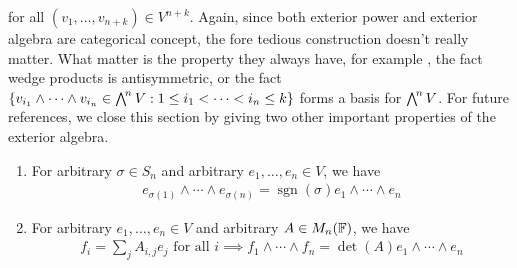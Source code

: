 \documentclass{report}
\begin{document}
for all $(v_1,\dots ,v_{n+k})\in V^{n+k}$. Again, since both exterior power and exterior algebra are categorical concept, the fore tedious construction doesn't really matter. What matter is the property they always have, for example , the fact wedge products is antisymmetric, or the fact $\set{v_{i_1}\wedge  \cdots \wedge  v_{i_n} \in \extp^n V: 1\leq i_1 < \cdots < i_n \leq k  }$ forms a basis for $\extp^n V$. For future references, we close this section by giving two other important properties of the exterior algebra. 
\begin{enumerate}[label=(\alph*)]
  \item For arbitrary $\sigma \in S_n$ and arbitrary $e_1, \dots ,e_n \in V$, we have 
    \begin{align*}
    e_{\sigma (1)}\wedge  \cdots \wedge  e_{\sigma (n)}=  \operatorname{sgn}(\sigma)e_1 \wedge \cdots \wedge  e_{n}  
    \end{align*}  
  \item For arbitrary $e_1, \dots ,e_n \in V$ and arbitrary $A \in M_n(\mathbb{F})$, we have  
    \begin{align*}
    f_i=  \sum_j A_{i,j}e_j \text{ for all }i\implies f_1\wedge  \cdots \wedge  f_n = \operatorname{det}(A) e_1 \wedge  \cdots \wedge  e_n    
    \end{align*}
\end{enumerate}
\end{document}
